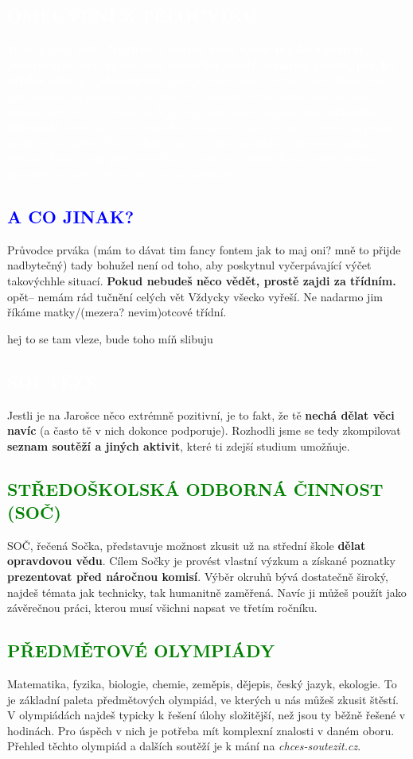 \documentclass{article}
\newcommand{\nadpiss}[1]{
\vspace*{-60pt}
  \begin{nadpisboxs}
    \vspace*{20pt}
    \centering \section*{\textcolor{white}{#1}}
  \end{nadpisboxs}
}
\newcommand{\podnadpisf}[1]{
  \subsection*{\textcolor{blue}{#1}}
}
\newcommand{\podnadpiss}[1]{
  \subsection*{\textcolor{green}{#1}}
}
\begin{document}
\begin{bluebox}
  \textcolor{white}{\subsection*{OMLUVENÍ Z TĚLOCVIKU}
  To by jen tak nešlo. \textbf{Nejdřív ti doktor musí vydat nějaké lejstro či potvrzení o tom, že do toho tělocviku prostě nemůžeš chodit, pak ho předáš nám a... jsi omluven.} proč je tučná celá ta věta? uncool Bude tam ještě trocha papírování, ale snažíme se vycházet vstříc (nebudeme, proboha, nikoho nutit cvičit se sádrou). V prváku také podstupujeme \textbf{test plavecké zdatnosti}, kterému se nevyhneš bez uvolnění. Pokud na něj v prváku nepřijdeš, půjdeš ve druháku. Tak důslední jsme. (Pokud nepřijdeš v druháku, přijdeš ve třeťáku. Pokud nepřijdeš ve třeťáku a zvolíš si vodácký kurz, budeš zkoušky provádět na místě před všemi svými spolužáky.)
  }
\end{bluebox}

\podnadpisf{A CO JINAK?}
Průvodce prváka (mám to dávat tim fancy fontem jak to maj oni? mně to přijde nadbytečný) tady bohužel není od toho, aby poskytnul vyčerpávající výčet takovýchhle situací. \textbf{Pokud nebudeš něco vědět, prostě zajdi za třídním.} opět-- nemám rád tučnění celých vět Vždycky všecko vyřeší. Ne nadarmo jim říkáme matky/(mezera? nevim)otcové třídní.

hej to se tam vleze, bude toho míň slibuju
\pagebreak
\nadpiss{SOUTĚŽE}
\noindent Jestli je na Jarošce něco extrémně pozitivní, je to fakt, že tě \textbf{nechá dělat věci navíc} (a často tě v nich dokonce podporuje). Rozhodli jsme se tedy zkompilovat \textbf{seznam soutěží a jiných aktivit}, které ti zdejší studium umožňuje.

\vspace{5pt}
\podnadpiss{STŘEDOŠKOLSKÁ ODBORNÁ ČINNOST (SOČ)}
SOČ, řečená Sočka, představuje možnost zkusit už na střední škole \textbf{dělat opravdovou vědu}. Cílem Sočky je provést vlastní výzkum a získané poznatky \textbf{prezentovat před náročnou komisí}. Výběr okruhů bývá dostatečně široký, najdeš témata jak technicky, tak humanitně zaměřená. Navíc ji můžeš použít jako závěrečnou práci, kterou musí všichni napsat ve třetím ročníku.

\podnadpiss{PŘEDMĚTOVÉ OLYMPIÁDY}
Matematika, fyzika, biologie, chemie, zeměpis, dějepis, český jazyk, ekologie. To je základní paleta předmětových olympiád, ve kterých u nás můžeš zkusit štěstí. V olympiádách najdeš typicky k řešení úlohy složitější, než jsou ty běžně řešené v hodinách. Pro úspěch v nich je potřeba mít komplexní znalosti v daném oboru. Přehled těchto olympiád a dalších soutěží je k mání na \textit{chces-soutezit.cz}.
\end{document}

